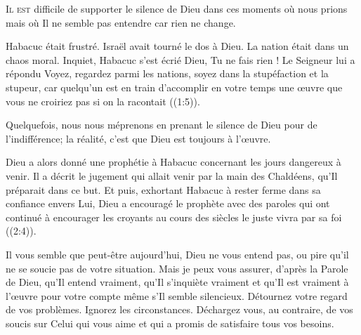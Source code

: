 \dvrule






\lettrine{I}{l est} difficile de supporter le silence de Dieu
 \ocadr dans ces moments où nous prions mais où Il ne semble pas
 entendre car rien ne change. 

Habacuc était frustré. Israël avait tourné le dos à Dieu.
 La nation était dans un chaos moral. Inquiet, Habacuc s'est écrié\frcolon{} 
 \Og Dieu, Tu ne fais rien ! \Fg{} 
 Le Seigneur lui a répondu\frcolon{} \Og Voyez, regardez parmi les nations,
 soyez dans la stupéfaction et la stupeur, car quelqu'un est en train
 d'accomplir en votre temps une \oe{}uvre que vous ne croiriez pas
 si on la racontait \Fg{} ((1:5)).


Quelquefois, nous nous méprenons en prenant le silence de Dieu
 pour de l'indifférence; la réalité, c'est que Dieu est toujours à l'\oe{}uvre. 

Dieu a alors donné une prophétie à Habacuc concernant les jours dangereux
 à venir. Il a décrit le jugement qui allait venir par la main des Chaldéens,
 qu'Il préparait dans ce but. Et puis, exhortant Habacuc à rester ferme
 dans sa confiance envers Lui, Dieu a encouragé le prophète avec des paroles
 qui ont continué à encourager les croyants au cours des siècles\frcolon{}
 \Og le juste vivra par sa foi \Fg{} ((2:4)). 

Il vous semble que peut-être aujourd'hui, Dieu ne vous entend pas, ou pire
 \ocadr qu'il ne se soucie pas de votre situation. Mais je peux vous assurer,
 d'après la Parole de Dieu, qu'Il entend vraiment,
 qu'Il s'inquiète vraiment et qu'Il est vraiment à l'\oe{}uvre pour votre compte
 \ocadr même s'Il semble silencieux. Détournez votre regard de vos problèmes.
 Ignorez les circonstances. Déchargez vous, au contraire, de vos soucis
 sur Celui qui vous aime et qui a promis de satisfaire tous vos besoins. 

